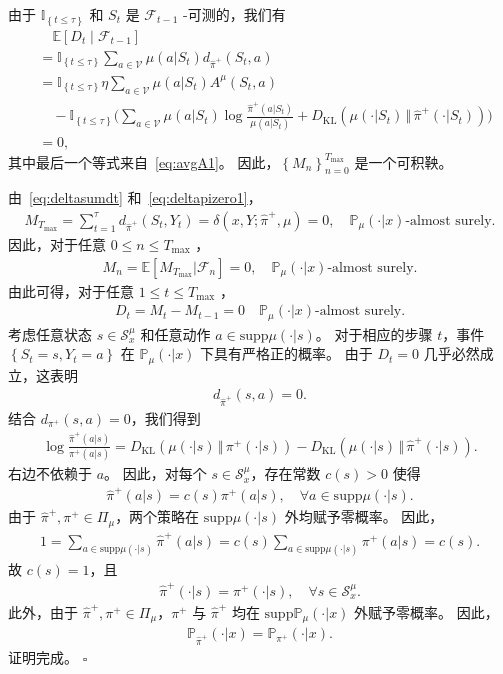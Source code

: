 \documentclass[11pt]{article}
\theoremstyle{definition}
\def\eq#1{\begin{equation*}\begin{split}#1\end{split}\end{equation*}}
\def\br#1{\left[ #1 \right ] }
\def\dr#1{\left\{#1\right\}}
\def\calF{\mathcal{F}}
\def\calS{\mathcal{S}}
\def\prB#1{\Big( #1 \Big)}
\def\KL#1#2{D_{\mathrm{KL}}(#1 \,\Vert\, #2)}
\newcommand\Eb{\mathbb{E}}
\newcommand\cmu{\mathbb{P}_{\mu}}
\def\cpx#1{\mathbb{P}_{#1}}
\begin{document}
\begin{appendices}
由于 $\mathbb{I}_{\dr{t\leq\tau}}$ 和 $S_t$ 是
$\calF_{t-1}$ -可测的，我们有
\eq{
    &\quad \Eb\br{D_t\mid\calF_{t-1}} \\
    &= \mathbb{I}_{\dr{t\leq\tau}}\sum_{a\in\mathcal V}\mu(a|S_t)d_{\hat{\pi}^+}(S_t,a)
    \\
    &= \mathbb{I}_{\dr{t\leq\tau}}\eta\sum_{a\in\mathcal V}\mu(a|S_t)A^\mu(S_t,a)
    \\
    &\quad
    - \mathbb{I}_{\dr{t\leq\tau}}\prB{\sum_{a\in\mathcal V}\mu(a|S_t)\log\frac{\hat{\pi}^+(a|S_t)}{\mu(a|S_t)}
    +
    \KL{\mu(\cdot|S_t)}{\hat{\pi}^+(\cdot|S_t)}}
    \\
    &=0,  
}
其中最后一个等式来自~\eqref{eq:avgA1}。 
因此，$\dr{M_n}_{n=0}^{T_{\max}}$ 是一个可积鞅。

由~\eqref{eq:deltasumdt} 和~\eqref{eq:deltapizero1}，
\eq{
    M_{T_{\max}} = \sum_{t=1}^{\tau} d_{\hat{\pi}^+}(S_t,Y_t) = \delta(x,Y;\hat{\pi}^+,\mu) = 0, \quad \text{$\cmu(\cdot|x)$-almost surely.}
}
因此，对于任意 $0\leq n\leq T_{\max}$ ，
\eq{
    M_n = \Eb\br{M_{T_{\max}} | \calF_n}= 0,
    \quad \text{$\cmu(\cdot|x)$-almost surely.}
}
由此可得，对于任意 $1\leq t\leq T_{\max}$ ，
\eq{
    D_t = M_t - M_{t-1} = 0 \quad \text{$\cmu(\cdot|x)$-almost surely.}
}
考虑任意状态 $s\in\calS_x^\mu$ 和任意动作
$a\in\text{supp}\mu(\cdot|s)$。
对于相应的步骤 $t$，事件 $\dr{S_t=s, Y_t=a}$ 在 $\cmu(\cdot|x)$ 下具有严格正的概率。
由于 $D_t=0$ 几乎必然成立，这表明
\eq{
    d_{\hat{\pi}^+}(s,a)=0.
}
结合 $d_{\pi^+}(s,a)=0$，我们得到
\eq{
    \log\frac{\hat{\pi}^+(a|s)}{\pi^+(a|s)} = \KL{\mu(\cdot|s)}{\pi^+(\cdot|s)} - \KL{\mu(\cdot|s)}{\hat{\pi}^+(\cdot|s)}.  
}
右边不依赖于 $a$。
因此，对每个 $s\in\calS_x^\mu$，存在常数 $c(s)>0$ 使得
\eq{
    \hat{\pi}^+(a|s) = c(s)\pi^+(a|s), \quad \forall a\in\text{supp}\mu(\cdot|s).
}
由于 $\hat{\pi}^+,\pi^+\in\Pi_\mu$，两个策略在 $\text{supp}\mu(\cdot|s)$ 外均赋予零概率。
因此，
\eq{
    1 = \sum_{a\in\text{supp}\mu(\cdot|s)}
    \hat{\pi}^+(a|s)
    = c(s)\sum_{a\in\text{supp}\mu(\cdot|s)}
    \pi^+(a|s)
    = c(s).  
}
故 $c(s)=1$，且
\eq{
    \hat{\pi}^+(\cdot|s) = \pi^+(\cdot|s), \quad \forall s\in\calS_x^\mu.
}
此外，由于 $\hat{\pi}^+,\pi^+\in\Pi_\mu$，$\pi^+$ 与 $\hat{\pi}^+$ 均在 $\text{supp}\cmu(\cdot|x)$ 外赋予零概率。
因此，
\eq{
    \cpx{\hat{\pi}^+}(\cdot|x) = \cpx{\pi^+}(\cdot|x).  
}
证明完成。
\hfill $\square$


\end{appendices}
\end{document}
